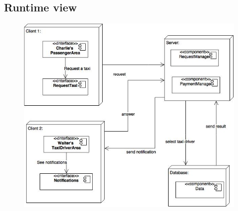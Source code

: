		\subsection{Runtime view}
		\vspace{2cm}
			\begin{figure}[h]
				\centering
				\includegraphics[scale=0.65]{Diagrams/runTime.jpg}
			\end{figure}
	\newpage
